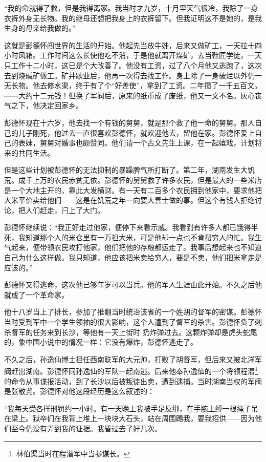 \documentclass[10pt]{book}
\begin{document}
“我的命就得了救，但是我得离家。我当时才九岁，十月里天气很冷，我除了一身衣裤外身无长物。我的继母还想把我身上的衣裤留下。但我证明这不是她的，是我生身的母亲给我做的。”

这就是彭德怀闯世界的生活的开始。他起先当放牛娃，后来又做矿工，一天拉十四小时风箱。工作时间这么长使他吃不消，于是他就离开煤矿，去当鞋匠学徒，一天只工作十二小时，这已是个大改善了。他没有工资，过了八个月他又逃跑了，这次去到烧碱矿做工。矿井歇业后，他再一次得去找工作。身上除了一身破烂以外仍一无长物。他去修水渠，终于有了个“好差使”，拿到了工资。二年攒了一千五百文。——大约十二元钱！但换了军阀后，原来的纸币成了废纸，他又一文不名。灰心丧气之下，他决定回家乡。

彭德怀现在十六岁，他去找一个有钱的舅舅，就是那个救了他一命的舅舅。那人自己的儿子刚死，他过去一直很喜欢彭德怀，就欢迎他去，留他在家。彭德怀爱上自己的表妹，舅舅对婚事也颇赞同。他们请一个古文先生上课，在一起嬉戏，计划将来的共同生活。

但是这些计划被彭德怀的无法抑制的暴躁脾气所打断了。第二年，湖南发生大饥荒。成千上万的农民赤贫无依。彭德怀的舅舅救了许多农民，但是最大的一些米店是一个大地主开的，靠此大发横财。有一天有二百多个农民拥到他家中，要求他把大米平价卖给他们——这是在饥荒之年一向要大善士做的事。但这个有钱人拒绝讨论，把人们赶走，闩上了大门。

彭德怀继续说：“我正好走过他家，便停下来看示威。我看到有许多人都已饿得半死，我知道那个人的米仓里有一万担大米，可是他却一点也不肯帮穷人的忙。我生气起来，便带领农民攻打他家，他们把他的存粮都运走了。我事后想起来也不知道自己为什么这样做。我只知道，他应该把米卖给穷人，要是不卖，他们把米拿走是应该的。”

彭德怀又得逃命，这次他已够年岁可以当兵。他的军人生涯由此开始。不久之后他就成了一个革命家。

他十八岁当上了排长，参加了推翻当时统治该省的一个姓胡的督军的密谋。彭德怀当时受到军中一个学生领袖的很大影响，这个人遭到了督军的杀害。彭德怀负了刺杀督军的任务来到长沙，等他有一天上街时 扔炸弹过去。这颗炸弹却是虎头蛇尾的，象中国小说中的情况一样：它没有爆炸，彭德怀逃走了。

不久之后，孙逸仙博士担任西南联军的大元帅，打败了胡督军，但后来又被北洋军阀赶出湖南。彭德怀同孙逸仙的军队一起南逃。后来他奉孙逸仙的一个将领程潜\footnote{林伯渠当时在程潜军中当参谋长。}的命令从事谍报活动，到了长沙以后被叛徒出卖，遭到逮捕。当时湖南当权的军阀是张敬尧。彭德怀对他这段经历是这么叙述的：

“我每天受各样刑罚约一小时。有一天晚上我被手足反绑，在手腕上缚一根绳子吊在梁上。狱卒们在我背上堆上一块块大石头，站在周围踢我，要我招供——因为他们至今仍没有弄到我的证据。我昏过去了好几次。
\end{document}
